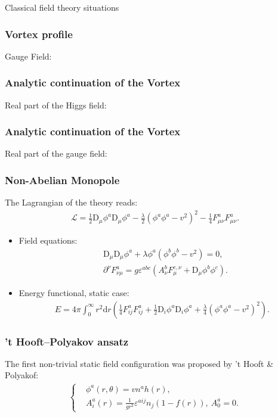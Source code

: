 \begin{section}{Classical field theory situations}
  \begin{frame}
    \frametitle{Vortex profile}
    Gauge Field:
    
  \end{frame}

  \begin{frame}
    \frametitle{Analytic continuation of the Vortex}
    Real part of the Higgs field:
    
  \end{frame}

  \begin{frame}
    \frametitle{Analytic continuation of the Vortex}
    Real part of the gauge field:
    
  \end{frame}

  \begin{frame}
    \frametitle{Non-Abelian Monopole}
    The Lagrangian of the  theory reads:
    \begin{align*}
      \mathcal L = \frac{1}{2}\mathrm D_\mu\phi^a\mathrm D_\mu\phi^a-\frac{\lambda}{2}(\phi^a\phi^a-v^2)^2-\frac{1}{4}F_{\mu\nu}^aF_{\mu\nu}^a.
    \end{align*}
    \begin{itemize}
    \item Field equations:
      \begin{align*}
        &\mathrm D_\mu\mathrm D_\mu\phi^a+\lambda\phi^a(\phi^b\phi^b-v^2) = 0,\\
        &\partial^\nu F^a_{\nu\mu}=g\varepsilon^{abc}(A_\nu^bF_\mu^{c,\nu}+\mathrm D_\mu\phi^b\phi^c).
      \end{align*}
    \item Energy functional, static case:
      \begin{align*}
        E=4\pi\int_0^\infty r^2\mathrm dr\left(\frac{1}{4}F_{ij}^aF_{ij}^a+\frac{1}{2}\mathrm D_i\phi^a\mathrm D_i\phi^a +\frac{\lambda}{4}(\phi^a\phi^a-v^2)^2\right).
      \end{align*}
    \end{itemize}
  \end{frame}
  \begin{frame}
    \frametitle{'t Hooft--Polyakov ansatz} The first non-trivial
    static field configuration was proposed by 't Hooft \& Polyakof:
    \begin{align*}
      \left\{
      \begin{aligned}
        &\phi^a(r,\theta) = vn^ah(r),\\
        &A^a_i(r) = \frac{1}{gr^2}\varepsilon^{aij}n_j(1-f(r)),\ A_0^a = 0.

\end{aligned}
\end{align*}
\end{frame}
\end{section}
